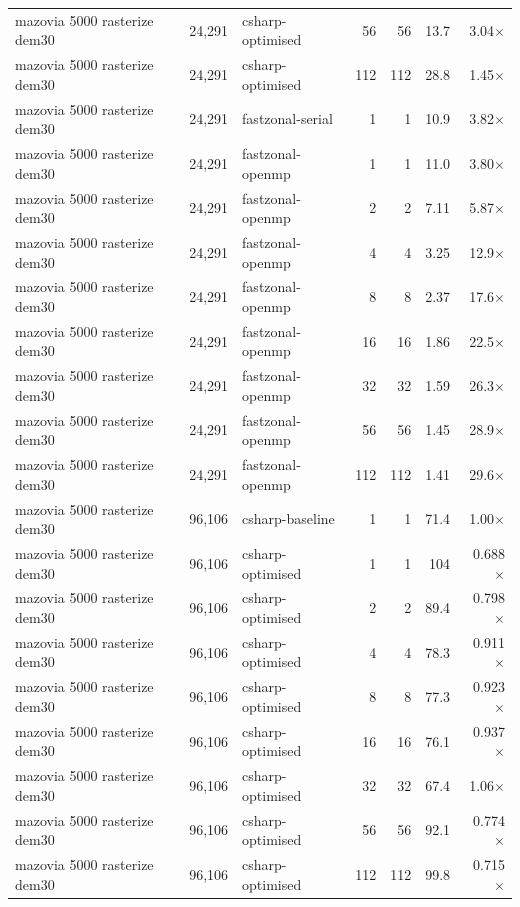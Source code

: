 \begin{tabular}{lrlrrrr}
mazovia 5000 rasterize dem30 & 24,291 & csharp-optimised & 56 & 56 & 13.7 & 3.04$\times$ \\
mazovia 5000 rasterize dem30 & 24,291 & csharp-optimised & 112 & 112 & 28.8 & 1.45$\times$ \\
mazovia 5000 rasterize dem30 & 24,291 & fastzonal-serial & 1 & 1 & 10.9 & 3.82$\times$ \\
mazovia 5000 rasterize dem30 & 24,291 & fastzonal-openmp & 1 & 1 & 11.0 & 3.80$\times$ \\
mazovia 5000 rasterize dem30 & 24,291 & fastzonal-openmp & 2 & 2 & 7.11 & 5.87$\times$ \\
mazovia 5000 rasterize dem30 & 24,291 & fastzonal-openmp & 4 & 4 & 3.25 & 12.9$\times$ \\
mazovia 5000 rasterize dem30 & 24,291 & fastzonal-openmp & 8 & 8 & 2.37 & 17.6$\times$ \\
mazovia 5000 rasterize dem30 & 24,291 & fastzonal-openmp & 16 & 16 & 1.86 & 22.5$\times$ \\
mazovia 5000 rasterize dem30 & 24,291 & fastzonal-openmp & 32 & 32 & 1.59 & 26.3$\times$ \\
mazovia 5000 rasterize dem30 & 24,291 & fastzonal-openmp & 56 & 56 & 1.45 & 28.9$\times$ \\
mazovia 5000 rasterize dem30 & 24,291 & fastzonal-openmp & 112 & 112 & 1.41 & 29.6$\times$ \\
mazovia 5000 rasterize dem30 & 96,106 & csharp-baseline & 1 & 1 & 71.4 & 1.00$\times$ \\
mazovia 5000 rasterize dem30 & 96,106 & csharp-optimised & 1 & 1 & 104 & 0.688$\times$ \\
mazovia 5000 rasterize dem30 & 96,106 & csharp-optimised & 2 & 2 & 89.4 & 0.798$\times$ \\
mazovia 5000 rasterize dem30 & 96,106 & csharp-optimised & 4 & 4 & 78.3 & 0.911$\times$ \\
mazovia 5000 rasterize dem30 & 96,106 & csharp-optimised & 8 & 8 & 77.3 & 0.923$\times$ \\
mazovia 5000 rasterize dem30 & 96,106 & csharp-optimised & 16 & 16 & 76.1 & 0.937$\times$ \\
mazovia 5000 rasterize dem30 & 96,106 & csharp-optimised & 32 & 32 & 67.4 & 1.06$\times$ \\
mazovia 5000 rasterize dem30 & 96,106 & csharp-optimised & 56 & 56 & 92.1 & 0.774$\times$ \\
mazovia 5000 rasterize dem30 & 96,106 & csharp-optimised & 112 & 112 & 99.8 & 0.715$\times$ \\

\end{tabular}
